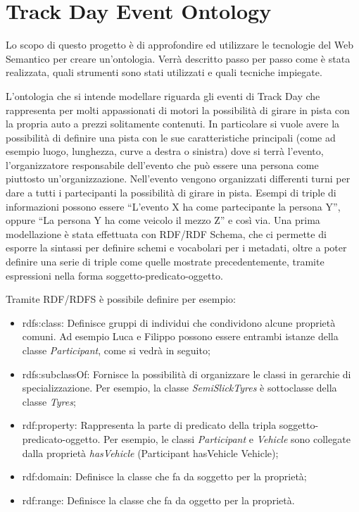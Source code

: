 \chapter{Track Day Event Ontology}
Lo scopo di questo progetto è di approfondire ed utilizzare le tecnologie del Web Semantico per creare un'ontologia. Verrà descritto passo per passo come è stata realizzata, quali strumenti sono stati utilizzati e quali tecniche impiegate. 
\\\par
L'ontologia che si intende modellare riguarda gli eventi di Track Day che rappresenta per molti appassionati di motori la possibilità di girare in pista con la propria auto a prezzi solitamente contenuti. In particolare si vuole avere la possibilità di definire una pista con le sue caratteristiche principali (come ad esempio luogo, lunghezza, curve a destra o sinistra) dove si terrà l’evento, l’organizzatore responsabile dell’evento che può essere una persona come piuttosto un’organizzazione. Nell’evento vengono organizzati differenti turni per dare a tutti i partecipanti la possibilità di girare in pista. Esempi di triple di informazioni possono essere “L’evento X ha come partecipante la persona Y”, oppure “La persona Y ha come veicolo il mezzo Z” e così via.
Una prima modellazione è stata effettuata con RDF/RDF Schema, che ci permette di esporre la sintassi per definire schemi e vocabolari per i metadati, oltre a poter definire una serie di triple come quelle mostrate precedentemente, tramite espressioni nella forma soggetto-predicato-oggetto.
\\\par
Tramite RDF/RDFS è possibile definire per esempio:
\begin{itemize}
\item rdfs:class: Definisce gruppi di individui che condividono alcune proprietà comuni. Ad esempio Luca e Filippo possono essere entrambi istanze della classe \textit{Participant}, come si vedrà in seguito;
\item rdfs:subclassOf: Fornisce la possibilità di organizzare le classi in gerarchie di specializzazione. Per esempio, la classe \textit{SemiSlickTyres} è sottoclasse della classe \textit{Tyres};
\item rdf:property: Rappresenta la parte di predicato della tripla soggetto-predicato-oggetto. Per esempio, le classi \textit{Participant} e \textit{Vehicle} sono collegate dalla proprietà \textit{hasVehicle} (Participant hasVehicle Vehicle);
\item rdf:domain: Definisce la classe che fa da soggetto per la proprietà;
\item rdf:range: Definisce la classe che fa da oggetto per la proprietà.
\end{itemize}

